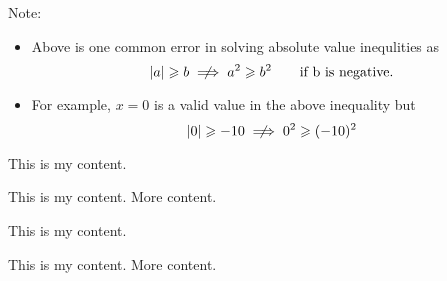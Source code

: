 \begin{tcbraster}[standard,      raster equal height=rows,raster columns=2,
colback=LightGreen,colframe=DarkGreen,colbacktitle=LimeGreen!75!DarkGreen,
left=1mm,right=1mm,top=1mm,bottom=1mm,middle=1mm]
\begin{tcolorbox}
\tcbline


Note:
\begin{itemize}
       \item[] Above is one common error in solving absolute value inequlities as 
                \[    \lvert a \rvert \geqslant b       \centernot\implies     a^2 \geqslant b^2  \quad  \quad \text{if b is negative.} \]    
    
      \item[]  For example, $x=0$ is a valid value in the above inequality but
                \[     \lvert 0 \rvert \geqslant -10       \centernot\implies     0^2 \geqslant (-10)^2 \] 
\end{itemize}
\end{tcolorbox}

\begin{tcolorbox}
This is my content.
\end{tcolorbox}
\begin{tcolorbox}
This is my content.
\tcblower
More content.
\end{tcolorbox}
\begin{tcolorbox}[adjusted title=My title]
This is my content.
\end{tcolorbox}
\begin{tcolorbox}[adjusted title=My title]
This is my content.
\tcblower
More content.
\end{tcolorbox}
\end{tcbraster}




